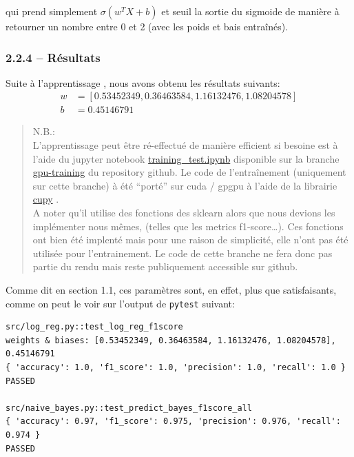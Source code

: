 \documentclass[
]{article}
\begin{document}
qui prend simplement \(\sigma(w^T X + b)\) et seuil la sortie du
sigmoide de manière à retourner un nombre entre 0 et 2 (avec les poids
et bais entraînés).

\newpage{}

\subsubsection{2.2.4 -- Résultats}\label{ruxe9sultats}

Suite à l'apprentissage , nous avons obtenu les résultats suivants:
\begin{align*}
    w &= [0.53452349, 0.36463584, 1.16132476, 1.08204578]\\
    b &= 0.45146791
\end{align*}

\begin{quote}
N.B.:\\
L'apprentissage peut être ré-effectué de manière efficient si besoine
est à l'aide du jupyter notebook
\href{https://github.com/David-Kyrat/13X005-AI-Project/blob/gpu-training/training_test.ipynb}{training\_test.ipynb}
disponible sur la branche
\href{https://github.com/David-Kyrat/13X005-AI-Project/blob/gpu-training/training_test.ipynb}{gpu-training}
du repository github. Le code de l'entraînement (uniquement sur cette
branche) à été ``porté'' sur cuda / gpgpu à l'aide de la librairie
\href{https://cupy.dev}{cupy} \cite{NumPySciPyGPU}.\\
A noter qu'il utilise des fonctions des sklearn alors que nous devions
les implémenter nous mêmes, (telles que les metrics f1-score\ldots). Ces
fonctions ont bien été implenté mais pour une raison de simplicité, elle
n'ont pas été utilisée pour l'entrainement. Le code de cette branche ne
fera donc pas partie du rendu mais reste publiquement accessible sur
github.
\end{quote}

\vspace{0.3cm}

Comme dit en section 1.1, ces paramètres sont, en effet, plus que
satisfaisants, comme on peut le voir sur l'output de \texttt{pytest}
suivant:

\begin{lstlisting}
src/log_reg.py::test_log_reg_f1score 
weights & biases: [0.53452349, 0.36463584, 1.16132476, 1.08204578], 0.45146791  
{ 'accuracy': 1.0, 'f1_score': 1.0, 'precision': 1.0, 'recall': 1.0 }
PASSED

src/naive_bayes.py::test_predict_bayes_f1score_all  
{ 'accuracy': 0.97, 'f1_score': 0.975, 'precision': 0.976, 'recall': 0.974 }
PASSED
\end{lstlisting}
\end{document}
